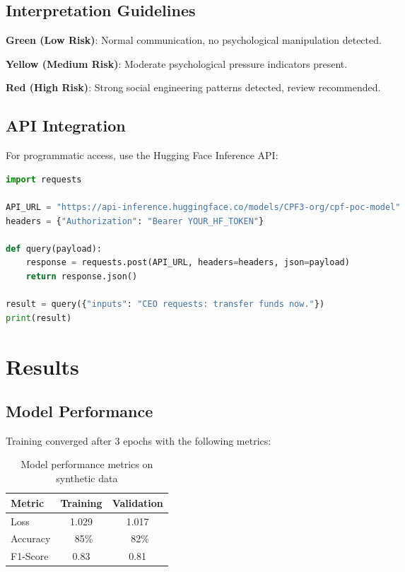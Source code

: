 \documentclass[11pt,a4paper]{article}
\begin{document}
\subsection{Interpretation Guidelines}

\textbf{Green (Low Risk)}: Normal communication, no psychological manipulation detected.

\textbf{Yellow (Medium Risk)}: Moderate psychological pressure indicators present.

\textbf{Red (High Risk)}: Strong social engineering patterns detected, review recommended.

\subsection{API Integration}

For programmatic access, use the Hugging Face Inference API:

\begin{lstlisting}[language=Python, caption=API Usage]
import requests

API_URL = "https://api-inference.huggingface.co/models/CPF3-org/cpf-poc-model"
headers = {"Authorization": "Bearer YOUR_HF_TOKEN"}

def query(payload):
    response = requests.post(API_URL, headers=headers, json=payload)
    return response.json()

result = query({"inputs": "CEO requests: transfer funds now."})
print(result)
\end{lstlisting}

\section{Results}

\subsection{Model Performance}

Training converged after 3 epochs with the following metrics:

\begin{table}[H]
\centering
\begin{tabular}{lcc}
\toprule
Metric & Training & Validation \\
\midrule
Loss & 1.029 & 1.017 \\
Accuracy & ~85\% & ~82\% \\
F1-Score & 0.83 & 0.81 \\
\bottomrule
\end{tabular}
\caption{Model performance metrics on synthetic data}
\label{tab:performance}
\end{table}
\end{document}
